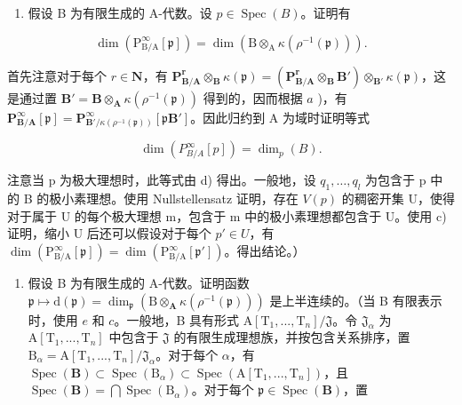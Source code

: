 \begin{enumerate}
\def\labelenumi{\alph{enumi})}
\setcounter{enumi}{4}
\tightlist
\item
  假设 B 为有限生成的 A-代数。设 \(p \in \operatorname{Spec}(B)\)。证明有
\end{enumerate}

\[
\dim (\mathrm{P} _ {\mathrm{B/A}} ^ {\infty} [ \mathfrak {p} ]) = \dim \left(\mathrm{B} \otimes_ {\mathrm{A}} \kappa (\rho^ {- 1} (\mathfrak {p}))\right).
\]

  首先注意对于每个 \(r \in \mathbf{N}\)，有 \(\mathbf{P}_{\mathbf{B}/\mathbf{A}}^{\mathbf{r}} \otimes_{\mathbf{B}} \kappa(\mathfrak{p}) = (\mathbf{P}_{\mathbf{B}/\mathbf{A}}^{\mathbf{r}} \otimes_{\mathbf{B}} \mathbf{B}') \otimes_{\mathbf{B}'} \kappa(\mathfrak{p})\)，这是通过置 \(\mathbf{B}' = \mathbf{B} \otimes_{\mathbf{A}} \kappa(\rho^{-1}(\mathfrak{p}))\) 得到的，因而根据 \(a\) )，有 \(\mathbf{P}_{\mathbf{B}/\mathbf{A}}^{\infty}[\mathfrak{p}] = \mathbf{P}_{\mathbf{B}' / \kappa(\rho^{-1}(\mathfrak{p}))}^{\infty}[\mathfrak{p}\mathbf{B}']\)。因此归约到 A 为域时证明等式

\[
\dim \left(P _ {B / A} ^ {\infty} [ p ]\right) = \dim_ {p} (B).
\]

注意当 p 为极大理想时，此等式由 d) 得出。一般地，设 \(q_{1}, \ldots, q_{l}\) 为包含于 p 中的 B 的极小素理想。使用 Nullstellensatz 证明，存在 \(V(p)\) 的稠密开集 U，使得对于属于 U 的每个极大理想 m，包含于 m 中的极小素理想都包含于 U。使用 c) 证明，缩小 U 后还可以假设对于每个 \(p' \in U\)，有 \(\dim(\mathrm{P}_{\mathrm{B/A}}^{\infty}[\mathfrak{p}]) = \dim(\mathrm{P}_{\mathrm{B/A}}^{\infty}[\mathfrak{p}'])\)。得出结论。）

\begin{enumerate}
\def\labelenumi{\alph{enumi})}
\setcounter{enumi}{5}
\tightlist
\item
  假设 B 为有限生成的 A-代数。证明函数 \(\mathfrak{p} \mapsto \mathrm{d}(\mathfrak{p}) = \dim_{\mathfrak{p}} (\mathrm{B} \otimes_{\mathbf{A}} \kappa(\rho^{-1}(\mathfrak{p})))\) 是上半连续的。（当 B 有限表示时，使用 \(e\) 和 \(c\)。一般地，B 具有形式 \(\mathrm{A}[\mathrm{T}_1, ..., \mathrm{T}_n]/\mathfrak{J}\)。令 \(\mathfrak{J}_{\alpha}\) 为 \(\mathrm{A}[\mathrm{T}_1, ..., \mathrm{T}_n]\) 中包含于 \(\mathfrak{J}\) 的有限生成理想族，并按包含关系排序，置 \(\mathrm{B}_{\alpha} = \mathrm{A}[\mathrm{T}_1, ..., \mathrm{T}_n]/\mathfrak{J}_{\alpha}\)。对于每个 \(\alpha\)，有 \(\operatorname{Spec}(\mathbf{B}) \subset \operatorname{Spec}(\mathrm{B}_{\alpha}) \subset \operatorname{Spec}(\mathrm{A}[\mathrm{T}_1, ..., \mathrm{T}_n])\)，且 \(\operatorname{Spec}(\mathbf{B}) = \bigcap \operatorname{Spec}(\mathrm{B}_{\alpha})\)。对于每个 \(\mathfrak{p} \in \operatorname{Spec}(\mathbf{B})\)，置
\end{enumerate}

